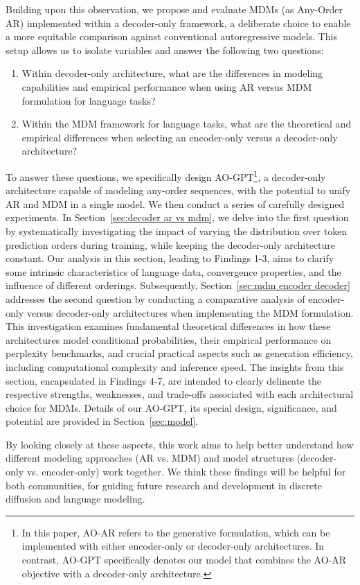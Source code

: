 Building upon this observation, we propose and evaluate MDMs (as Any-Order AR) implemented within a decoder-only framework, a deliberate choice to enable a more equitable comparison against conventional autoregressive models. This setup allows us to isolate variables and answer the following two questions: 
\begin{enumerate}
    \item Within decoder-only architecture, what are the differences in modeling capabilities and empirical performance when using AR versus MDM formulation for language tasks?
    
    \item Within the MDM framework for language tasks, what are the theoretical and empirical differences when selecting an encoder-only versus a decoder-only architecture?
\end{enumerate}
To answer these questions, we specifically design AO-GPT\footnote{In this paper, AO-AR refers to the generative formulation, which can be implemented with either encoder-only or decoder-only architectures. In contrast, AO-GPT specifically denotes our model that combines the AO-AR objective with a decoder-only architecture.}, a decoder-only architecture capable of modeling any-order sequences, with the potential to unify AR and MDM in a single model. We then conduct a series of carefully designed experiments. In Section~\ref{sec:decoder ar vs mdm}, we delve into the first question by systematically investigating the impact of varying the distribution over token prediction orders during training, while keeping the decoder-only architecture constant. Our analysis in this section, leading to Findings 1-3, aims to clarify some intrinsic characteristics of language data, convergence properties, and the influence of different orderings. Subsequently, Section~\ref{sec:mdm encoder decoder} addresses the second question by conducting a comparative analysis of encoder-only versus decoder-only architectures when implementing the MDM formulation. This investigation examines fundamental theoretical differences in how these architectures model conditional probabilities, their empirical performance on perplexity benchmarks, and crucial practical aspects such as generation efficiency, including computational complexity and inference speed. The insights from this section, encapsulated in Findings 4-7, are intended to clearly delineate the respective strengths, weaknesses, and trade-offs associated with each architectural choice for MDMs. 
Details of our AO-GPT, its special design, significance, and potential are provided in Section~\ref{sec:model}.

By looking closely at these aspects, this work aims to help better understand how different modeling approaches (AR vs. MDM) and model structures (decoder-only vs. encoder-only) work together. We think these findings will be helpful for both communities, for guiding future research and development in discrete diffusion and language modeling.

